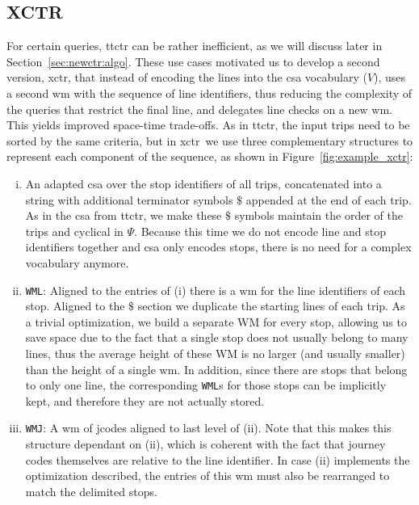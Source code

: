     \subsection{XCTR}
    \label{sec:newctr:str:xctr}
    For certain queries, \gls{ttctr} can be rather inefficient, as we will discuss later in Section~\ref{sec:newctr:algo}. These use cases motivated us to develop a second version, \gls{xctr}, that instead of encoding the lines into the \gls{csa} vocabulary ($V$), uses a second \gls{wm} with the sequence of line identifiers, thus reducing the complexity of the queries that restrict the final line, and delegates line checks on a new \gls{wm}. This yields improved space-time trade-offs. As in \gls{ttctr}, the input trips need to be sorted by the same criteria, but in \gls{xctr}~we use three complementary structures to represent each component of the sequence, as shown in Figure~\ref{fig:example_xctr}:
    \begin{enumerate}[(i)]
        \item An adapted \gls{csa} over the stop identifiers of all trips, concatenated into a string with additional terminator symbols $\$$ appended at the end of each trip. As in the \gls{csa} from \gls{ttctr}, we make these $\$$ symbols maintain the order of the trips and cyclical in $\Psi$. Because this time we do not encode line and stop identifiers together and \gls{csa} only encodes stops, there is no need for a complex vocabulary anymore.
        \item \texttt{WML}: Aligned to the entries of (i) there is a \gls{wm} for the line identifiers of each stop. Aligned to the $\$$ section we duplicate the starting lines of each trip. As a trivial optimization, we build a separate WM for every stop, allowing us to save space due to the fact that a single stop does not usually belong to many lines, thus the average height of these WM is no larger (and usually smaller) than the height of a single \gls{wm}. In addition, since there are stops that belong to only one line, the corresponding \texttt{WML}s for those stops can be implicitly kept, and therefore they are not actually stored.
        \item \texttt{WMJ}: A \gls{wm} of jcodes aligned to last level of (ii). Note that this makes this structure dependant on (ii), which is coherent with the fact that journey codes themselves are relative to the line identifier. In case (ii) implements the optimization described, the entries of this \gls{wm} must also be rearranged to match the delimited stops.
    \end{enumerate}
    
